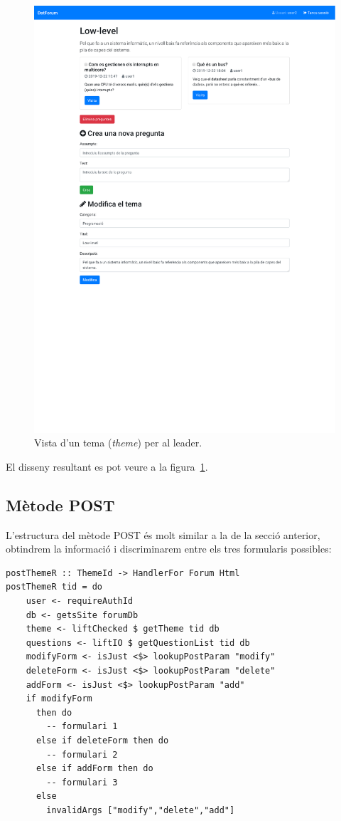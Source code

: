 \documentclass[catalan, a4paper]{scrartcl}
\begin{document}
\begin{figure}
\centering \includegraphics[trim={0 13.4cm 0 0}, clip, width=.98\columnwidth, cframe=gray]{screens/theme_admin.pdf}
\caption{\label{fig:theme_admin} Vista d'un tema (\emph{theme}) per al leader. }
\end{figure}

El disseny resultant es pot veure a la figura~\ref{fig:theme_admin}.

\subsection*{Mètode \textsf{POST}}

L'estructura del mètode \textsf{POST} és molt similar a la de la secció
anterior, obtindrem la informació i discriminarem entre els tres formularis
possibles:

\begin{verbatim}
postThemeR :: ThemeId -> HandlerFor Forum Html
postThemeR tid = do
    user <- requireAuthId
    db <- getsSite forumDb
    theme <- liftChecked $ getTheme tid db
    questions <- liftIO $ getQuestionList tid db
    modifyForm <- isJust <$> lookupPostParam "modify"
    deleteForm <- isJust <$> lookupPostParam "delete"
    addForm <- isJust <$> lookupPostParam "add"
    if modifyForm
      then do
        -- formulari 1
      else if deleteForm then do
        -- formulari 2
      else if addForm then do
        -- formulari 3
      else
        invalidArgs ["modify","delete","add"]
\end{verbatim}
\end{document}
